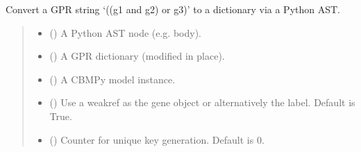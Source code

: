 \documentclass[letterpaper,12pt,english]{sphinxmanual}
\begin{document}
\begin{fulllineitems}
\label{\detokenize{api/core:cbmpy.CBCommon.createAssociationDictFromNode}}
\pysigstartsignatures
\pysiglinewithargsret
{}
{\sphinxparamcomma {}\sphinxparamcomma {}\sphinxparamcomma {}\sphinxparamcomma {}}
{}
\pysigstopsignatures
\sphinxAtStartPar
Convert a GPR string ‘((g1 and g2) or g3)’ to a dictionary via a Python AST.
\begin{quote}\begin{description}
\begin{itemize}
\item {} 
\sphinxAtStartPar
{} () \textendash{} A Python AST node (e.g. body).

\item {} 
\sphinxAtStartPar
{} () \textendash{} A GPR dictionary (modified in place).

\item {} 
\sphinxAtStartPar
{} ({\hyperref[\detokenize{api/core:cbmpy.CBModel.Fbase}]{}}) \textendash{} A CBMPy model instance.

\item {} 
\sphinxAtStartPar
{} (\sphinxstyleliteralemphasis{\sphinxupquote{, }}) \textendash{} Use a weakref as the gene object or alternatively the label. Default is True.

\item {} 
\sphinxAtStartPar
{} (\sphinxstyleliteralemphasis{\sphinxupquote{, }}) \textendash{} Counter for unique key generation. Default is 0.

\end{itemize}

\sphinxAtStartPar
{}

\end{description}\end{quote}

\end{fulllineitems}
\end{document}
